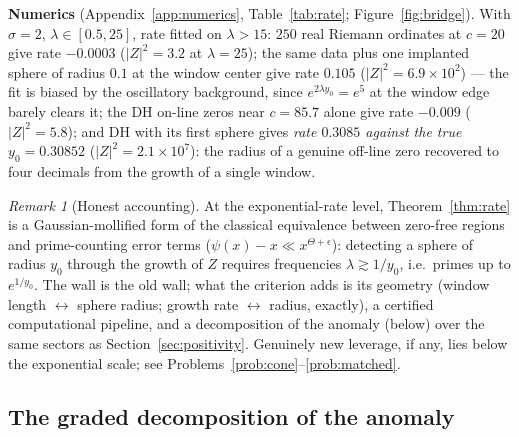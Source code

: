 \documentclass[11pt]{amsart}
\theoremstyle{plain}
\theoremstyle{definition}
\theoremstyle{remark}
\newtheorem{remark}[theorem]{Remark}
\begin{document}
\textbf{Numerics} (Appendix~\ref{app:numerics}, Table~\ref{tab:rate}; Figure~\ref{fig:bridge}). With
$\sigma=2$, $\lambda\in[0.5,25]$, rate fitted on $\lambda>15$: $250$ real Riemann ordinates at
$c=20$ give rate $-0.0003$ ($|Z|^2=3.2$ at $\lambda=25$); the same data plus one implanted
sphere of radius $0.1$ at the window center give rate $0.105$
($|Z|^2=6.9\times10^2$) --- the fit is biased by the oscillatory background, since
$e^{2\lambda y_0}=e^5$ at the window edge barely clears it; the DH on-line zeros near $c=85.7$
alone give rate $-0.009$ ($|Z|^2=5.8$); and DH with its first sphere gives
\emph{rate $0.3085$ against the true $y_0=0.30852$} ($|Z|^2=2.1\times10^7$): the radius of a
genuine off-line zero recovered to four decimals from the growth of a single window.

\begin{remark}[Honest accounting]\label{rem:honest}
At the exponential-rate level, Theorem~\ref{thm:rate} is a Gaussian-mollified form of the
classical equivalence between zero-free regions and prime-counting error terms
($\psi(x)-x\ll x^{\Theta+\epsilon}$): detecting a sphere of radius $y_0$ through the growth of
$Z$ requires frequencies $\lambda\gtrsim1/y_0$, i.e.\ primes up to $e^{1/y_0}$. The wall is the
old wall; what the criterion adds is its geometry (window length $\leftrightarrow$ sphere
radius; growth rate $\leftrightarrow$ radius, exactly), a certified computational pipeline, and
a decomposition of the anomaly (below) over the same sectors as
Section~\ref{sec:positivity}. Genuinely new leverage, if any, lies below the exponential scale;
see Problems~\ref{prob:cone}--\ref{prob:matched}.
\end{remark}

\subsection{The graded decomposition of the anomaly}\label{subsec:graded-anomaly}
\end{document}
